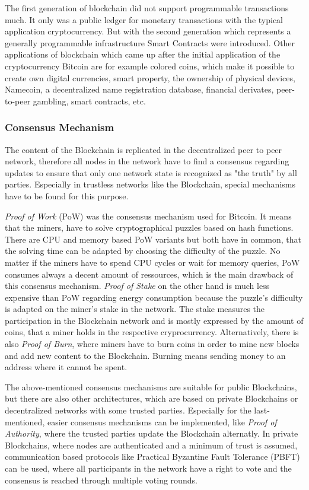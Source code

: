 \documentclass[conference]{IEEEtran}
\begin{document}
The first generation of blockchain did not support programmable transactions much. It only was a public ledger for monetary transactions with the typical application cryptocurrency. But with the second generation which represents a generally programmable infrastructure Smart Contracts were introduced.\cite{Xu2016} Other applications of blockchain which came up after the initial application of the cryptocurrency Bitcoin are for example colored coins, which make it possible to create own digital currencies, smart property, the ownership of physical devices, Namecoin, a decentralized name registration database, financial derivates, peer-to-peer gambling, smart contracts, etc.\cite{Buterin2014}

\subsubsection{Consensus Mechanism}
The content of the Blockchain is replicated in the decentralized peer to peer network, therefore all nodes in the network have to find a consensus regarding updates to ensure that only one network state is recognized as "the truth" by all parties. Especially in trustless networks like the Blockchain, special mechanisms have to be found for this purpose. \cite{Dinh?}\par 
\textit{Proof of Work} (PoW) was the consensus mechanism used for Bitcoin. It means that the miners, have to solve cryptographical puzzles based on hash functions. There are CPU and memory based PoW variants but both have in common, that the solving time can be adapted by choosing the difficulty of the puzzle. No matter if the miners have to spend CPU cycles or wait for memory queries, PoW consumes always a decent amount of ressources, which is the main drawback of this consensus mechanism. \cite{Dinh?} \cite{Golze2009}
\textit{Proof of Stake} on the other hand is much less expensive than PoW regarding energy consumption because the puzzle's difficulty is adapted on the miner's stake in the network. The stake measures the participation in the Blockchain network and is mostly expressed by the amount of coins, that a miner holds in the respective cryprocurrency. Alternatively, there is also \textit{Proof of Burn}, where miners have to burn coins in order to mine new blocks and add new content to the Blockchain. Burning means sending money to an address where it cannot be spent. \cite{Dinh?} \par
The above-mentioned consensus mechanisms are suitable for public Blockchains, but there are also other architectures, which are based on private Blockchains or decentralized networks with some trusted parties. Especially for the last-mentioned, easier consensus mechanisms can be implemented, like \textit{Proof of Authority}, where the trusted parties update the Blockchain alternatly. In private Blockchains, where nodes are authenticated and a minimum of trust is assumed, communication based protocols like Practical Byzantine Fault Tolerance (PBFT) can be used, where all participants in the network have a right to vote and the consensus is reached through multiple voting rounds. \cite{Dinh?} \par 
\end{document}
